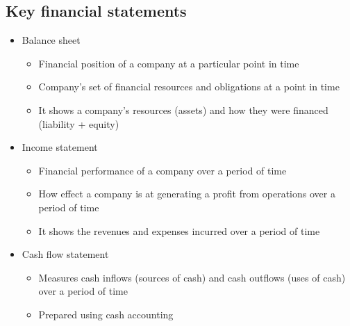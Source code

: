 \documentclass{article}
\begin{document}
	\subsection{Key financial statements}
		\begin{itemize}
			\item Balance sheet
				\begin{itemize}
					\item Financial position of a company \colorbox{pastel_red}{at a particular point in time}
					\item Company's set of financial resources and obligations at a point in time
					\item It shows a company's resources (assets) and how they were financed (liability + equity)
				\end{itemize}
			\item Income statement
				\begin{itemize}
					\item Financial performance of a company over a period of time
					\item How effect a company is at generating a profit from operations \colorbox{pastel_red}{over a period of time}
					\item It shows the revenues and expenses incurred over a period of time
				\end{itemize}
			\item Cash flow statement
				\begin{itemize}
					\item Measures cash inflows (sources of cash) and cash outflows (uses of cash) \colorbox{pastel_red}{over a period of time}
					\item Prepared using cash accounting
				\end{itemize}
		\end{itemize}
\end{document}
